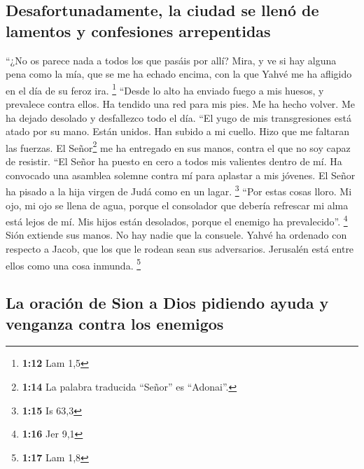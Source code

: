 \hypertarget{desafortunadamente-la-ciudad-se-llenuxf3-de-lamentos-y-confesiones-arrepentidas}{%
\subsection{Desafortunadamente, la ciudad se llenó de lamentos y
confesiones
arrepentidas}\label{desafortunadamente-la-ciudad-se-llenuxf3-de-lamentos-y-confesiones-arrepentidas}}

 ``¿No os parece nada a todos los que pasáis por allí?
Mira, y ve si hay alguna pena como la mía, que se me ha echado encima,
con la que Yahvé me ha afligido en el día de su feroz ira. \footnote{\textbf{1:12}
  Lam 1,5}  ``Desde lo alto ha enviado fuego a mis
huesos, y prevalece contra ellos. Ha tendido una red para mis pies. Me
ha hecho volver. Me ha dejado desolado y desfallezco todo el día.
 ``El yugo de mis transgresiones está atado por su mano.
Están unidos. Han subido a mi cuello. Hizo que me faltaran las fuerzas.
El Señor\footnote{\textbf{1:14} La palabra traducida ``Señor'' es
  ``Adonai''.} me ha entregado en sus manos, contra el que no soy capaz
de resistir.  ``El Señor ha puesto en cero a todos mis
valientes dentro de mí. Ha convocado una asamblea solemne contra mí para
aplastar a mis jóvenes. El Señor ha pisado a la hija virgen de Judá como
en un lagar. \footnote{\textbf{1:15} Is 63,3}  ``Por
estas cosas lloro. Mi ojo, mi ojo se llena de agua, porque el consolador
que debería refrescar mi alma está lejos de mí. Mis hijos están
desolados, porque el enemigo ha prevalecido''. \footnote{\textbf{1:16}
  Jer 9,1}  Sión extiende sus manos. No hay nadie que la
consuele. Yahvé ha ordenado con respecto a Jacob, que los que le rodean
sean sus adversarios. Jerusalén está entre ellos como una cosa inmunda.
\footnote{\textbf{1:17} Lam 1,8}

\hypertarget{la-oraciuxf3n-de-sion-a-dios-pidiendo-ayuda-y-venganza-contra-los-enemigos}{%
\subsection{La oración de Sion a Dios pidiendo ayuda y venganza contra
los
enemigos}\label{la-oraciuxf3n-de-sion-a-dios-pidiendo-ayuda-y-venganza-contra-los-enemigos}}

